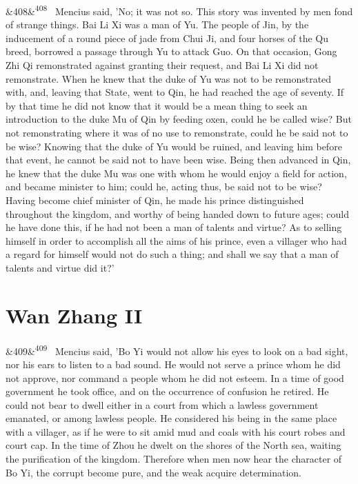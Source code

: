 \documentclass[12pt]{article}
\newcommand{\para}[1][]{\par\noindent\ifx&#1&\else\textsuperscript{\footnotesize #1}~\fi}
\begin{document}
\para[408] Mencius said, 'No; it was not so. This story was invented by men fond of strange things. Bai Li Xi was a man of Yu. The people of Jin, by the inducement of a round piece of jade from Chui Ji, and four horses of the Qu breed, borrowed a passage through Yu to attack Guo. On that occasion, Gong Zhi Qi remonstrated against granting their request, and Bai Li Xi did not remonstrate. When he knew that the duke of Yu was not to be remonstrated with, and, leaving that State, went to Qin, he had reached the age of seventy. If by that time he did not know that it would be a mean thing to seek an introduction to the duke Mu of Qin by feeding oxen, could he be called wise? But not remonstrating where it was of no use to remonstrate, could he be said not to be wise? Knowing that the duke of Yu would be ruined, and leaving him before that event, he cannot be said not to have been wise. Being then advanced in Qin, he knew that the duke Mu was one with whom he would enjoy a field for action, and became minister to him; could he, acting thus, be said not to be wise? Having become chief minister of Qin, he made his prince distinguished throughout the kingdom, and worthy of being handed down to future ages; could he have done this, if he had not been a man of talents and virtue? As to selling himself in order to accomplish all the aims of his prince, even a villager who had a regard for himself would not do such a thing; and shall we say that a man of talents and virtue did it?'

\section*{Wan Zhang II}

\para[409] Mencius said, 'Bo Yi would not allow his eyes to look on a bad sight, nor his ears to listen to a bad sound. He would not serve a prince whom he did not approve, nor command a people whom he did not esteem. In a time of good government he took office, and on the occurrence of confusion he retired. He could not bear to dwell either in a court from which a lawless government emanated, or among lawless people. He considered his being in the same place with a villager, as if he were to sit amid mud and coals with his court robes and court cap. In the time of Zhou he dwelt on the shores of the North sea, waiting the purification of the kingdom. Therefore when men now hear the character of Bo Yi, the corrupt become pure, and the weak acquire determination.
\end{document}
